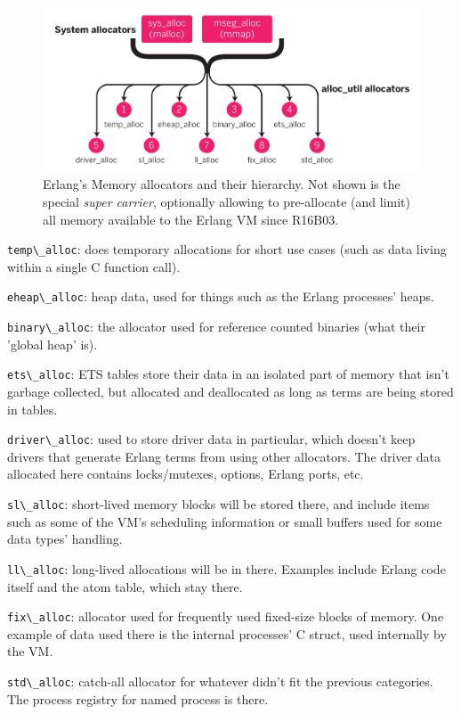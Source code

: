 \documentclass[11pt, oneside]{book}   	%
\newcommand{\term}[1]{\Verb`#1`}
\begin{document}
\begin{figure}
  \includegraphics{memory-allocs.pdf}%
  \caption{Erlang's Memory allocators and their hierarchy. Not shown is the special \emph{super carrier}, optionally allowing to pre-allocate (and limit) all memory available to the Erlang VM since R16B03.}%
   \label{fig:allocators}
\end{figure}

\begin{enumerate*}
    \item \term{temp\_alloc}: does temporary allocations for short use cases (such as data living within a single C function call).
    \item \term{eheap\_alloc}: heap data, used for things such as the Erlang processes' heaps.
    \item \term{binary\_alloc}: the allocator used for reference counted binaries (what their 'global heap' is).
    \item \term{ets\_alloc}: ETS tables store their data in an isolated part of memory that isn't garbage collected, but allocated and deallocated as long as terms are being stored in tables.
    \item \term{driver\_alloc}: used to store driver data in particular, which doesn't keep drivers that generate Erlang terms from using other allocators. The driver data allocated here contains locks/mutexes, options, Erlang ports, etc.
    \item \term{sl\_alloc}: short-lived memory blocks will be stored there, and include items such as some of the VM's scheduling information or small buffers used for some data types' handling.
    \item \term{ll\_alloc}: long-lived allocations will be in there. Examples include Erlang code itself and the atom table, which stay there.
    \item \term{fix\_alloc}: allocator used for frequently used fixed-size blocks of memory. One example of data used there is the internal processes' C struct, used internally by the VM.
    \item \term{std\_alloc}: catch-all allocator for whatever didn't fit the previous categories. The process registry for named process is there.
\end{enumerate*}
\end{document}
